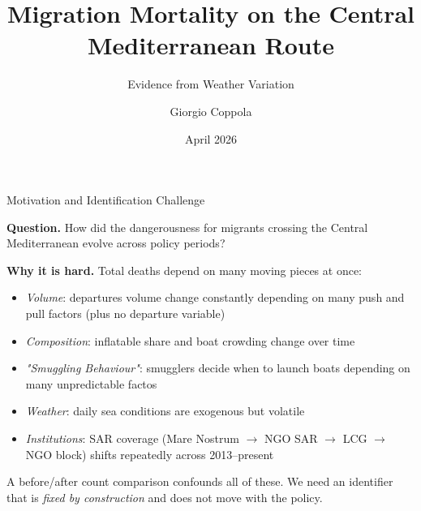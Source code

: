 \documentclass[aspectratio=169,10pt]{beamer}
\title{Migration Mortality on the Central Mediterranean Route}
\subtitle{Evidence from Weather Variation}
\author{Giorgio Coppola}
\institute{Hertie School --- Master of Data Science}
\date{April 2026}
\begin{document}
\begin{frame}
\titlepage
\end{frame}

\begin{frame}{Motivation and Identification Challenge}

\textbf{Question.} How did the dangerousness for migrants crossing the Central
Mediterranean evolve across policy periods?

\vspace{0.5em}
\textbf{Why it is hard.} Total deaths depend on many moving pieces at once:
\begin{itemize}
  \item \emph{Volume}: departures volume change constantly depending on many push and pull factors (plus no departure variable)
  \item \emph{Composition}: inflatable share and boat crowding change
  over time
  \item \emph{"Smuggling Behaviour"}: smugglers decide when to launch boats depending on many unpredictable factos
  \item \emph{Weather}: daily sea conditions are exogenous but volatile
  \item \emph{Institutions}: SAR coverage (Mare Nostrum $\to$ NGO SAR $\to$ LCG $\to$ NGO block) shifts repeatedly across 2013--present
\end{itemize}

\vspace{0.5em}
A before/after count comparison confounds all of these. We need an identifier
that is \emph{fixed by construction} and does not move with the policy.

\end{frame}
\end{document}
